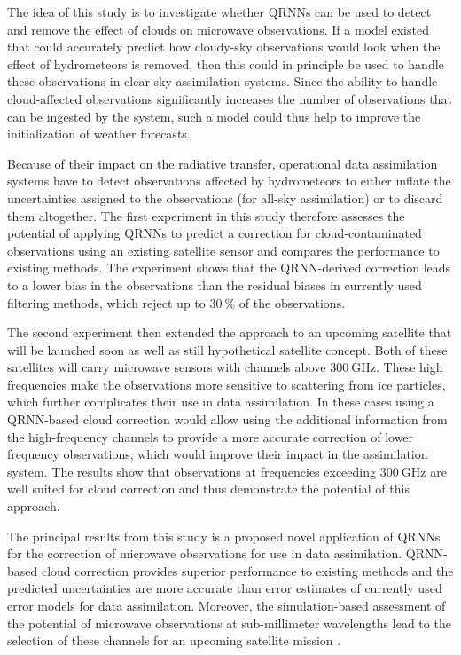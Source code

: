 The idea of this study is to investigate whether QRNNs can be used to detect and
remove the effect of clouds on microwave observations. If a model existed that
could accurately predict how cloudy-sky observations would look when the effect
of hydrometeors is removed, then this could in principle be used to handle these
observations in clear-sky assimilation systems. Since the ability to handle
cloud-affected observations significantly increases the number of observations
that can be ingested by the system, such a model could thus help to improve the
initialization of weather forecasts.

Because of their impact on the radiative transfer, operational data assimilation
systems have to detect observations affected by hydrometeors to either inflate
the uncertainties assigned to the observations (for all-sky assimilation) or to
discard them altogether. The first experiment in this study therefore assesses
the potential of applying QRNNs to predict a correction for cloud-contaminated
observations using an existing satellite sensor and compares the performance to
existing methods. The experiment shows that the QRNN-derived correction leads to
a lower bias in the observations than the residual biases in currently used
filtering methods, which reject up to $\SI{30}{\percent}$ of the observations.

The second experiment then extended the approach to an upcoming satellite that
will be launched soon as well as still hypothetical satellite concept. Both of
these satellites will carry microwave sensors with channels above
$\SI{300}{\giga \hertz}$. These high frequencies make the observations more
sensitive to scattering from ice particles, which further complicates their use
in data assimilation. In these cases using a QRNN-based cloud correction would
allow using the additional information from the high-frequency channels to
provide a more accurate correction of lower frequency observations, which would
improve their impact in the assimilation system. The results show that
observations at frequencies exceeding $\SI{300}{\giga \hertz}$ are well suited
for cloud correction and thus demonstrate the potential of this approach.

The principal results from this study is a proposed novel application of QRNNs
for the correction of microwave observations for use in data assimilation.
QRNN-based cloud correction provides superior performance to existing methods
and the predicted uncertainties are more accurate than error estimates of
currently used error models for data assimilation. Moreover, the
simulation-based assessment of the potential of microwave observations at
sub-millimeter wavelengths lead to the selection of these channels for an
upcoming satellite mission \citep{arctic_weather_satellite}.

